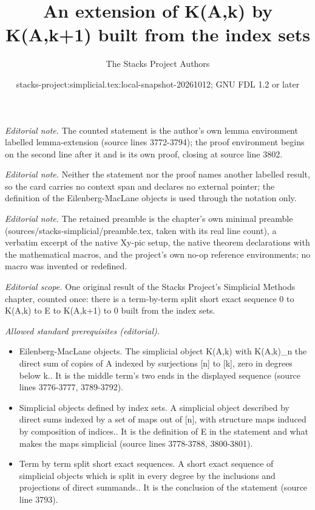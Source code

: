 \documentclass{stacks-project}
\title{An extension of K(A,k) by K(A,k+1) built from the index sets}
\author{The Stacks Project Authors}
\date{stacks-project:simplicial.tex:local-snapshot-20261012; GNU FDL 1.2 or later}
\theoremstyle{plain}
\theoremstyle{definition}
\theoremstyle{remark}
\numberwithin{equation}{subsection}
\begin{document}
\maketitle
\noindent\textit{Editorial note.} The counted statement is the author's own lemma environment labelled lemma-extension (source lines 3772-3794); the proof environment begins on the second line after it and is its own proof, closing at source line 3802.\par\medskip
\noindent\textit{Editorial note.} Neither the statement nor the proof names another labelled result, so the card carries no context span and declares no external pointer; the definition of the Eilenberg-MacLane objects is used through the notation only.\par\medskip
\noindent\textit{Editorial note.} The retained preamble is the chapter's own minimal preamble (sources/stacks-simplicial/preamble.tex, taken with its real line count), a verbatim excerpt of the native Xy-pic setup, the native theorem declarations with the mathematical macros, and the project's own no-op reference environments; no macro was invented or redefined.\par\medskip
\noindent\textit{Editorial scope.} One original result of the Stacks Project's Simplicial Methods chapter, counted once: there is a term-by-term split short exact sequence 0 to K(A,k) to E to K(A,k+1) to 0 built from the index sets.\par\medskip
\noindent\textit{Allowed standard prerequisites (editorial).}\begin{itemize}
\item Eilenberg-MacLane objects. The simplicial object K(A,k) with K(A,k)\_n the direct sum of copies of A indexed by surjections [n] to [k], zero in degrees below k.. It is the middle term's two ends in the displayed sequence (source lines 3776-3777, 3789-3792).
\item Simplicial objects defined by index sets. A simplicial object described by direct sums indexed by a set of maps out of [n], with structure maps induced by composition of indices.. It is the definition of E in the statement and what makes the maps simplicial (source lines 3778-3788, 3800-3801).
\item Term by term split short exact sequences. A short exact sequence of simplicial objects which is split in every degree by the inclusions and projections of direct summands.. It is the conclusion of the statement (source line 3793).
\end{itemize}\medskip
\end{document}
